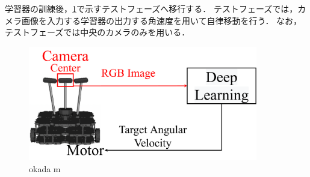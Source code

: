 \newpage
学習器の訓練後，\ref{fig::okada_method_test}で示すテストフェーズへ移行する．
テストフェーズでは，カメラ画像を入力する学習器の出力する角速度を用いて自律移動を行う．
なお，テストフェーズでは中央のカメラのみを用いる．
\begin{figure}[h]
    \centering
    \includegraphics[width = 10cm]{./figs/system_test_okada.pdf}
    \caption{okada m}
    \label{fig::okada_method_test}
\end{figure}